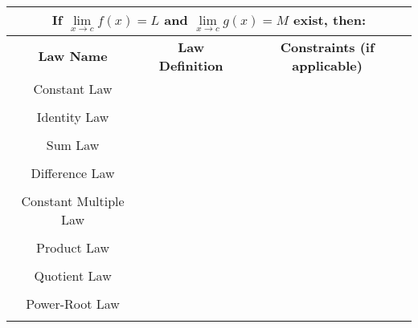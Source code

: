 \documentclass{siproblemset}
\begin{document}
    \vspace{-0.75cm}
    \begin{center}
       \begin{tabular}{ |c|c|c| } 
           \hline
           \multicolumn{3}{|c|}{If $\lim\limits_{x\to c}f(x)=L$ and $\lim\limits_{x\to c}g(x)=M$ exist, then:}\\[4ex]
           \hline
           \textbf{Law Name} & \textbf{Law Definition} & \textbf{Constraints (if applicable)} \\ 
           \hline
           Constant Law & \hspace{3in} & \\ 
           &&\\
           \hline
           Identity Law & \hspace{3in} & \\ 
           &&\\
           \hline
           Sum Law & \hspace{3in} & \\ 
           &&\\
           \hline
           Difference Law & \hspace{3in} & \\ 
           &&\\
           \hline
           Constant Multiple Law & \hspace{3in} & \\ 
           &&\\
           \hline
           Product Law & \hspace{3in} & \\ 
           &&\\
           \hline
           Quotient Law & \hspace{3in} & \\ 
           &&\\
           \hline
           Power-Root Law & \hspace{3in} & \\ 
           &&\\
           \hline
       \end{tabular}
    \end{center}
    
    
\end{document}
